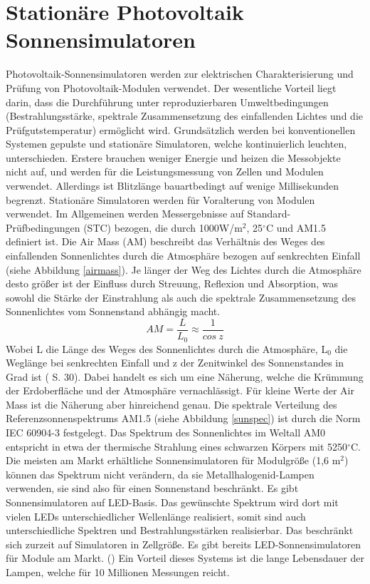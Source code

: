 \documentclass[a4paper,bibtotoc,oneside]{scrbook}
\begin{document}
\section{Stationäre Photovoltaik Sonnensimulatoren} \thispagestyle{empty}

Photovoltaik-Sonnensimulatoren werden zur elektrischen Charakterisierung und Prüfung von Photovoltaik-Modulen verwendet. Der wesentliche Vorteil liegt darin, dass die Durchführung unter reproduzierbaren Umweltbedingungen (Bestrahlungsstärke, spektrale Zusammensetzung des einfallenden Lichtes und die Prüfgutstemperatur)  ermöglicht wird. Grundsätzlich werden bei konventionellen Systemen gepulste und stationäre Simulatoren, welche kontinuierlich leuchten, unterschieden. Erstere brauchen weniger Energie und heizen die Messobjekte nicht auf, und werden für die Leistungsmessung von Zellen und Modulen verwendet. Allerdings ist Blitzlänge bauartbedingt auf wenige Millisekunden begrenzt. Stationäre Simulatoren werden für Voralterung von Modulen verwendet.
Im Allgemeinen werden Messergebnisse auf Standard-Prüfbedingungen (STC) bezogen, die durch 1000W/m$^2$, 25$^{\circ}$C und AM1.5 definiert ist. Die Air Mass (AM) beschreibt das Verhältnis des Weges des einfallenden Sonnenlichtes durch die Atmosphäre bezogen auf senkrechten Einfall (siehe Abbildung \ref{airmass}). Je länger der Weg des Lichtes durch die Atmosphäre desto größer ist der Einfluss durch Streuung, Reflexion und Absorption, was sowohl die Stärke der Einstrahlung als auch die spektrale Zusammensetzung des Sonnenlichtes vom Sonnenstand abhängig macht. 
\begin{equation}
     AM = \frac {L} {L_0} \approx \frac{1}{cos~ z}
\end{equation}
Wobei L die Länge des Weges des Sonnenlichtes durch die Atmosphäre, L$_0$ die Weglänge bei senkrechten Einfall und z der Zenitwinkel des Sonnenstandes in Grad ist (\cite{wurf} S. 30). Dabei handelt es sich um eine Näherung, welche die Krümmung der Erdoberfläche und der Atmosphäre vernachlässigt. Für kleine Werte der Air Mass ist die Näherung aber hinreichend genau.
Die spektrale Verteilung des Referenzsonnenspektrums AM1.5 (siehe Abbildung \ref{sunspec}) ist durch die Norm IEC 60904-3 \cite{norm3} festgelegt. Das Spektrum des Sonnenlichtes im Weltall AM0 entspricht in etwa der thermische Strahlung eines schwarzen Körpers mit 5250$^\circ$C.
Die meisten am Markt erhältliche Sonnensimulatoren für Modulgröße (1,6 m$^2$) können das Spektrum nicht verändern, da sie Metallhalogenid-Lampen verwenden, sie sind also für einen Sonnenstand beschränkt. Es gibt Sonnensimulatoren auf LED-Basis. Das gewünschte Spektrum wird dort mit vielen LEDs unterschiedlicher Wellenlänge realisiert, somit sind auch unterschiedliche Spektren und Bestrahlungsstärken realisierbar. Das beschränkt sich zurzeit auf Simulatoren in Zellgröße.  Es gibt bereits LED-Sonnensimulatoren für Module am Markt. (\cite{mps}) Ein Vorteil dieses Systems ist die lange Lebensdauer der Lampen, welche für 10 Millionen Messungen reicht. 
\end{document}
